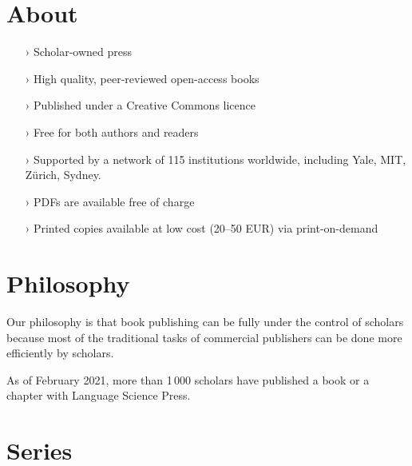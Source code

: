 \documentclass[
notumble,
nofoldmark,
]{leaflet}
\begin{document}
\section{\sffamily\Large\bfseries About} 
\begin{itemize}  
\setlength{\itemsep}{-3pt} 
 \item[›] Scholar-owned press
\item[›]  High quality, peer-reviewed open-access books  
 \item[›] Published under a Creative Commons licence
\item[›] Free for both authors and readers
 \item[›] Supported by a network of 115 institutions worldwide, including Yale, MIT, Zürich, Sydney.
 \item[›] PDFs are available free of charge 
 \item[›] Printed copies available at low cost (20--50 EUR) via print-on-demand
\end{itemize}
 
 \section{\sffamily\Large\bfseries Philosophy} 

 Our philosophy is that book publishing can be fully under the control of scholars because most of the traditional tasks of commercial publishers can be done more efficiently by scholars. 
 
As of February 2021, more than 1\,000 scholars have published a book or a chapter with Language Science Press.

\newpage 
\newlength{\submissionfactor}
\setlength{\submissionfactor}{.27mm}
\newcommand{\submission}[3]{
\parbox[m][.1cm][c]{2.5cm}{\color{LIGHTGRAY} #1}\colorbox{#2}{\parbox[m][.3cm][c]{#3\submissionfactor}{\bfseries\sffamily #3}}\\ 
}



\vspace*{4.8cm}
\section{\sffamily\Large\bfseries Series}
\end{document}
